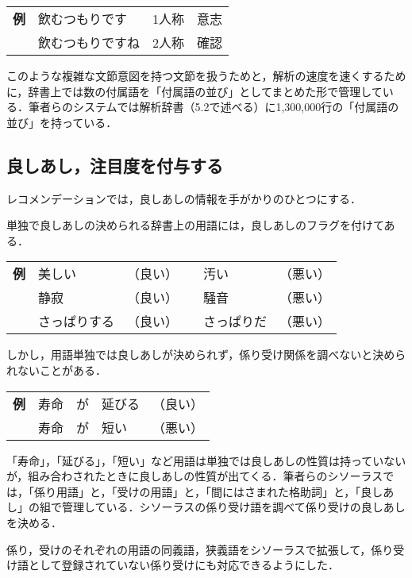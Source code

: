 \documentclass[japanese]{jnlp_1.4}
\begin{document}
\vspace{0.3zw}
\begin{tabular}{llll}
{\bfseries 例} & 飲むつもりです & 1人称 & 意志 \\
	& 飲むつもりですね & 2人称 & 確認 
\end{tabular}
\vspace{0.3zw}

このような複雑な文節意図を持つ文節を扱うためと，解析の速度を速くするために，辞書上では数の付属語を「付属語の並び」としてまとめた形で管理している．筆者らのシステムでは解析辞書（5.2で述べる）に1,300,000行の「付属語の並び」を持っている．


\subsection{良しあし，注目度を付与する}

レコメンデーションでは，良しあしの情報を手がかりのひとつにする．

単独で良しあしの決められる辞書上の用語には，良しあしのフラグを付けてある．

\vspace{0.3zw}
\begin{tabular}{llllll}
{\bfseries 例} & 美しい & （良い） && 汚い & （悪い）\\
	& 静寂 & （良い） && 騒音 & （悪い）\\
	& さっぱりする & （良い） && さっぱりだ & （悪い）
\end{tabular}
\vspace{0.3zw}


しかし，用語単独では良しあしが決められず，係り受け関係を調べないと決められないことがある．

\vspace{0.3zw}
\begin{tabular}{lllll}
{\bfseries 例} & 寿命 & が & 延びる & （良い）\\
	& 寿命 & が & 短い & （悪い）
\end{tabular}
\vspace{0.3zw}

「寿命」，「延びる」，「短い」など用語は単独では良しあしの性質は持っていないが，組み合わされたときに良しあしの性質が出てくる．筆者らのシソーラスでは，「係り用語」と，「受けの用語」と，「間にはさまれた格助詞」と，「良しあし」の組で管理している．シソーラスの係り受け語を調べて係り受けの良しあしを決める． 

係り，受けのそれぞれの用語の同義語，狭義語をシソーラスで拡張して，係り受け語として登録されていない係り受けにも対応できるようにした．
\end{document}
